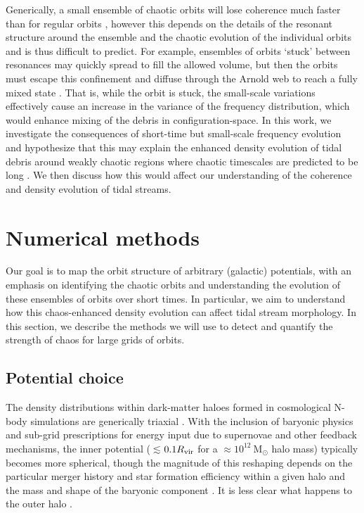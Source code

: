 \documentclass{mn2e}
\newcommand{\msun}{\ensuremath{\mathrm{M}_\odot}}
\begin{document}
Generically, a small ensemble of chaotic orbits will lose coherence much faster than for regular orbits \cite[see, e.g.,][]{kandrup94, merritt96, kandrup03}, however this depends on the details of the resonant structure around the ensemble and the chaotic evolution of the individual orbits and is thus difficult to predict. For example, ensembles of orbits `stuck' between resonances may quickly spread to fill the allowed volume, but then the orbits must escape this confinement and diffuse through the Arnold web to reach a fully mixed state \citep{merritt96}. That is, while the orbit is stuck, the small-scale variations effectively cause an increase in the variance of the frequency distribution, which would enhance mixing of the debris in configuration-space. In this work, we investigate the consequences of short-time but small-scale frequency evolution and hypothesize that this may explain the enhanced density evolution of tidal debris around weakly chaotic regions where chaotic timescales are predicted to be long \citep[e.g.,][]{pearson15}. We then discuss how this would affect our understanding of the coherence and density evolution of tidal streams.

\section{Numerical methods}\label{sec:methods}

Our goal is to map the orbit structure of arbitrary (galactic) potentials, with an emphasis on identifying the chaotic orbits and understanding the evolution of these ensembles of orbits over short times. In particular, we aim to understand how this chaos-enhanced density evolution can affect tidal stream morphology. In this section, we describe the methods we will use to detect and quantify the strength of chaos for large grids of orbits.

\subsection{Potential choice}\label{sec:potential}

The density distributions within dark-matter haloes formed in cosmological N-body simulations are generically triaxial \citep[e.g.,][]{jing02, bett07, zemp09, veraciro11}. With the inclusion of baryonic physics and sub-grid prescriptions for energy input due to supernovae and other feedback mechanisms, the inner potential ($\lesssim$$0.1R_{\rm vir}$ for a $\approx$$10^{12}~\msun$ halo mass) typically becomes more spherical, though the magnitude of this reshaping depends on the particular merger history and star formation efficiency within a given halo and the mass and shape of the baryonic component \citep[e.g.,][though in Milky Way-like galaxies, baryonic disks will add non-sphericity to the total potential]{dubinski94,kazantzidis04, debattista08, bryan13, butsky15}. It is less clear what happens to the outer halo \citep[e.g.,][]{zemp11, valluri13}.
\end{document}
